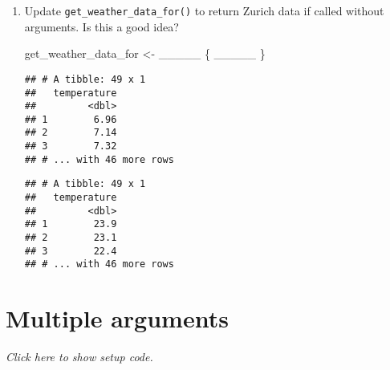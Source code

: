 \documentclass[]{book}
\newenvironment{Shaded}{\begin{snugshade}}{\end{snugshade}}
\newcommand{\KeywordTok}[1]{\textcolor[rgb]{0.13,0.29,0.53}{\textbf{#1}}}
\newcommand{\NormalTok}[1]{#1}
\newcommand{\OperatorTok}[1]{\textcolor[rgb]{0.81,0.36,0.00}{\textbf{#1}}}
\newcommand{\StringTok}[1]{\textcolor[rgb]{0.31,0.60,0.02}{#1}}
\begin{document}
\begin{enumerate}
\def\labelenumi{\arabic{enumi}.}
\item
  Update \texttt{get\_weather\_data\_for()} to return Zurich data if called without arguments. Is this a good idea?

\begin{Shaded}
\begin{Highlighting}[]
\NormalTok{get_weather_data_for <-}\StringTok{ }\NormalTok{_____ \{}
\NormalTok{  _____}
\NormalTok{\}}
\end{Highlighting}
\end{Shaded}

\begin{Shaded}
\end{Shaded}

\begin{verbatim}
## # A tibble: 49 x 1
##   temperature
##         <dbl>
## 1        6.96
## 2        7.14
## 3        7.32
## # ... with 46 more rows
\end{verbatim}

\begin{Shaded}
\end{Shaded}

\begin{verbatim}
## # A tibble: 49 x 1
##   temperature
##         <dbl>
## 1        23.9
## 2        23.1
## 3        22.4
## # ... with 46 more rows
\end{verbatim}
\end{enumerate}

\hypertarget{multiple-arguments}{%
\section{Multiple arguments}\label{multiple-arguments}}

\emph{Click here to show setup code.}
\end{document}
